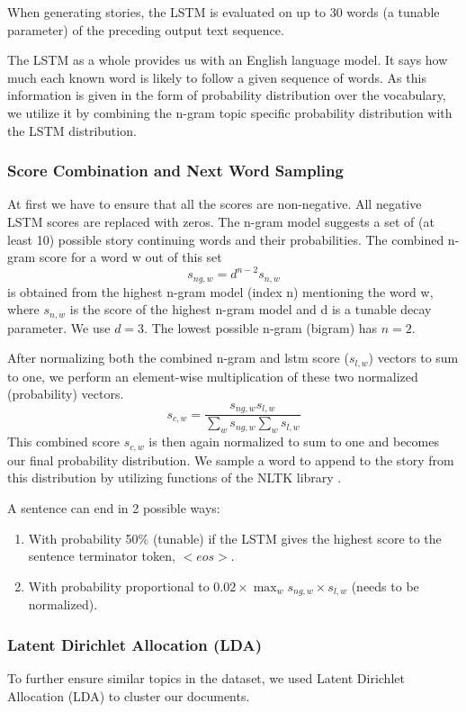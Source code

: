 \documentclass[12pt,a4paper,utf8]{article}
\begin{document}
When generating stories, the LSTM is evaluated on up to 30 words (a tunable parameter) of the preceding output text sequence. 

The LSTM as a whole provides us with an English language model. It says how much each known word is likely to follow a given sequence of words. As this information is given in the form of probability distribution over the vocabulary, we utilize it by combining the n-gram topic specific probability distribution with the LSTM distribution.

\subsubsection{Score Combination and Next Word Sampling}
At first we have to ensure that all the scores are non-negative. All negative LSTM scores are replaced with zeros. The n-gram model suggests a set of (at least 10) possible story continuing words and their probabilities. The combined n-gram score for a word w out of this set
\begin{equation}
s_{ng,w}= d^{n-2} s_{n,w}
\end{equation}
is obtained from the highest n-gram model (index n) mentioning the word w, where $s_{n,w}$ is the score of the highest n-gram model and d is a tunable decay parameter. We use $d=3$. The lowest possible n-gram (bigram) has $n=2$.

After normalizing both the combined n-gram and lstm score ($s_{l,w}$) vectors to sum to one, we perform an element-wise multiplication of these two normalized (probability) vectors.
\begin{equation}
s_{c,w}= \frac{s_{ng,w} s_{l,w}}{\sum_w{s_{ng,w}} \sum_w{s_{l,w}}}
\end{equation}
This combined score $s_{c,w}$ is then again normalized to sum to one and becomes our final probability distribution. We sample a word to append to the story from this distribution by utilizing functions of the NLTK library \cite{NLTK}.

A sentence can end in 2 possible ways:
\begin{enumerate}
\item With probability 50\% (tunable) if the LSTM gives the highest score to the sentence terminator token, $<eos>$.
\item With probability proportional to $0.02 \times \max_w{s_{ng,w}} \times s_{l,w}$ (needs to be normalized).
\end{enumerate}


\subsubsection{Latent Dirichlet Allocation (LDA)}
To further ensure similar topics in the dataset, we used Latent Dirichlet Allocation (LDA)\cite{blei2003latent} to cluster our documents.
\end{document}
